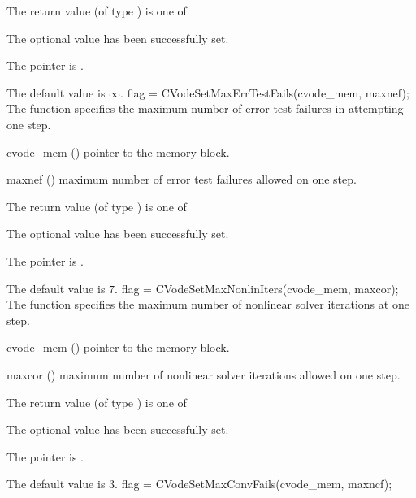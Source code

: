 {
  The return value  (of type ) is one of
  \begin{args}
  \item[\Id{CV\_SUCCESS}] 
    The optional value has been successfully set.
  \item[\Id{CV\_MEM\_NULL}]
    The  pointer is .
  \end{args}
}
{
  The default value is $\infty$.
}
{
flag = CVodeSetMaxErrTestFails(cvode\_mem, maxnef);
}
{
  The function  specifies the
  maximum number of error test failures in attempting one step.
}
{
  \begin{args}
  \item[cvode\_mem] ()
    pointer to the {\cvode} memory block.
  \item[maxnef] ()
    maximum number of error test failures allowed on one step.
  \end{args}
}
{
  The return value  (of type ) is one of
  \begin{args}
  \item[\Id{CV\_SUCCESS}] 
    The optional value has been successfully set.
  \item[\Id{CV\_MEM\_NULL}]
    The  pointer is .
  \end{args}
}
{
  The default value is $7$.
}
{
flag = CVodeSetMaxNonlinIters(cvode\_mem, maxcor);
}
{
  The function  specifies the maximum
  number of nonlinear solver iterations at one step.
}
{
  \begin{args}
  \item[cvode\_mem] ()
    pointer to the {\cvode} memory block.
  \item[maxcor] ()
    maximum number of nonlinear solver iterations allowed on one step.
  \end{args}
}
{
  The return value  (of type ) is one of
  \begin{args}
  \item[\Id{CV\_SUCCESS}] 
    The optional value has been successfully set.
  \item[\Id{CV\_MEM\_NULL}]
    The  pointer is .
  \end{args}
}
{
  The default value is $3$.
}
{
flag = CVodeSetMaxConvFails(cvode\_mem, maxncf);
}

